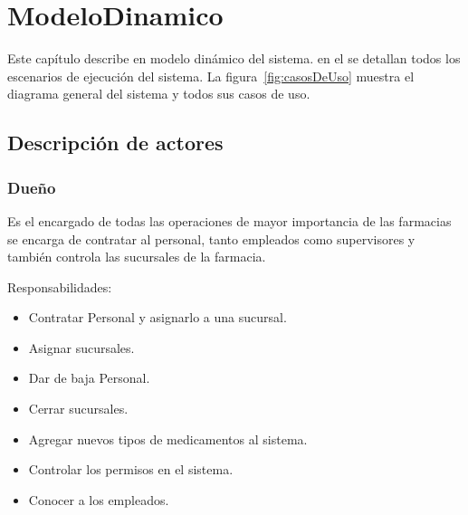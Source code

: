 \chapter{ModeloDinamico}	


	Este capítulo describe en modelo dinámico del sistema. en el se detallan todos los escenarios de ejecución del sistema. La figura~\ref{fig:casosDeUso} muestra el diagrama general del sistema y todos sus casos de uso.

\section{Descripción de actores}

\begin{Usuario}{\hypertarget{Dueño}{\subsection{Dueño}}}{
	Es el encargado de todas las operaciones de mayor importancia de las farmacias
	se encarga de contratar al personal, tanto empleados como supervisores y también controla las sucursales de la farmacia.
}
    \item[Responsabilidades:] \cdtEmpty
    \begin{itemize}
		\item Contratar Personal y asignarlo a una sucursal.
		\item Asignar  sucursales.
		\item Dar de baja Personal.
		\item Cerrar sucursales.
		\item Agregar nuevos tipos de medicamentos al sistema.
		\item Controlar los permisos en el sistema.
		\item Conocer a los empleados.	
    \end{itemize}
\end{Usuario}

